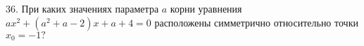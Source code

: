 36. При каких значениях параметра $a$ корни уравнения $ax^2+(a^2+a-2)x+a+4=0$ расположены симметрично относительно точки $x_0=-1?$\\

